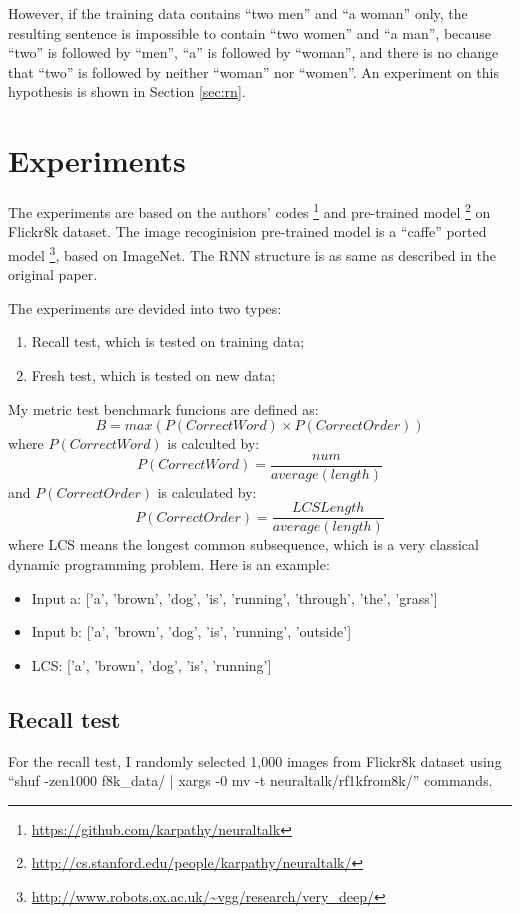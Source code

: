 \documentclass[10pt,twocolumn,letterpaper]{article}
\begin{document}
However, if the training data contains ``two men'' and ``a woman'' only,
the resulting sentence is impossible to contain ``two women'' and ``a man'',
because ``two'' is followed by ``men'', ``a'' is followed by ``woman'',
and there is no change that ``two'' is followed by neither ``woman'' nor ``women''.
An experiment on this hypothesis is shown in Section \ref{sec:rn}.


\section{Experiments}
The experiments are based on the authors' codes \footnote{\url{https://github.com/karpathy/neuraltalk}} and pre-trained model
\footnote{\url{http://cs.stanford.edu/people/karpathy/neuraltalk/}} on Flickr8k dataset.
The image recoginision pre-trained model is a ``caffe'' ported model \footnote{\url{http://www.robots.ox.ac.uk/~vgg/research/very_deep/}}, based on ImageNet.
The RNN structure is as same as described in the original paper.

The experiments are devided into two types:
\begin{enumerate}
    \item Recall test, which is tested on training data;
    \item Fresh test, which is tested on new data;
\end{enumerate}

My metric test benchmark funcions are defined as:
$$B = max(P(CorrectWord) \times P(CorrectOrder))$$
where $P(CorrectWord)$ is calculted by:
$$P(CorrectWord) = \frac{num}{average(length)}$$
and $P(CorrectOrder)$ is calculated by:
$$P(CorrectOrder) = \frac{LCSLength}{average(length)}$$
where LCS means the longest common subsequence, which is a very classical dynamic programming problem.
Here is an example:
\begin{itemize}
    \item Input a: ['a', 'brown', 'dog', 'is', 'running', 'through', 'the', 'grass']
    \item Input b: ['a', 'brown', 'dog', 'is', 'running', 'outside']
    \item LCS: ['a', 'brown', 'dog', 'is', 'running']
\end{itemize}

\subsection{Recall test}
For the recall test, I randomly selected 1,000 images from Flickr8k dataset using
``shuf -zen1000 f8k\_data/\text{*} | xargs -0 mv -t neuraltalk/rf1kfrom8k/'' commands.
\end{document}
